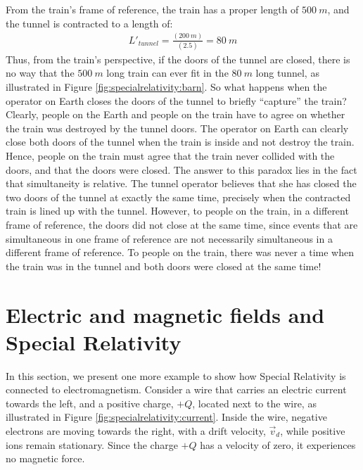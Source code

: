 From the train's frame of reference, the train has a proper length of $\SI{500}{m}$, and the tunnel is contracted to a length of:
\begin{align*}
L'_{tunnel}=\frac{(\SI{200}{m})}{(2.5)}=\SI{80}{m}
\end{align*}
Thus, from the train's perspective, if the doors of the tunnel are closed, there is no way that the $\SI{500}{m}$ long train can ever fit in the $\SI{80}{m}$ long tunnel, as illustrated in Figure \ref{fig:specialrelativity:barn}. So what happens when the operator on Earth closes the doors of the tunnel to briefly ``capture'' the train? 
Clearly, people on the Earth and people on the train have to agree on whether the train was destroyed by the tunnel doors. The operator on Earth can clearly close both doors of the tunnel when the train is inside and not destroy the train. Hence, people on the train must agree that the train never collided with the doors, and that the doors were closed. The answer to this paradox lies in the fact that simultaneity is relative. The tunnel operator believes that she has closed the two doors of the tunnel at exactly the same time, precisely when the contracted train is lined up with the tunnel. However, to people on the train, in a different frame of reference, the doors did not close at the same time, since events that are simultaneous in one frame of reference are not necessarily simultaneous in a different frame of reference. To people on the train, there was never a time when the train was in the tunnel and both doors were closed at the same time!
\section{Electric and magnetic fields and Special Relativity}
In this section, we present one more example to show how Special Relativity is connected to electromagnetism. Consider a wire that carries an electric current towards the left, and a positive charge, $+Q$, located next to the wire, as illustrated in Figure \ref{fig:specialrelativity:current}.
Inside the wire, negative electrons are moving towards the right, with a drift velocity, $\vec v_d$, while positive ions remain stationary. Since the charge $+Q$ has a velocity of zero, it experiences no magnetic force.

